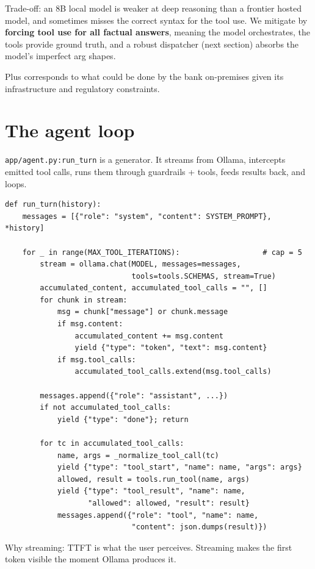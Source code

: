 \documentclass[11pt]{article}
\begin{document}
Trade-off: an 8B local model is weaker at deep reasoning than a frontier hosted model, and sometimes misses the correct syntax for the tool use. We mitigate by \textbf{forcing tool use for all factual answers}, meaning the model orchestrates, the tools provide ground truth, and a robust dispatcher (next section) absorbs the model's imperfect arg shapes.

Plus corresponds to what could be done by the bank on-premises given its infrastructure and regulatory constraints.

\section{The agent loop}

\texttt{app/agent.py:run\_turn} is a generator. It streams from Ollama, intercepts emitted tool calls, runs them through guardrails + tools, feeds results back, and loops.

\begin{lstlisting}[style=py]
def run_turn(history):
    messages = [{"role": "system", "content": SYSTEM_PROMPT}, *history]

    for _ in range(MAX_TOOL_ITERATIONS):                   # cap = 5
        stream = ollama.chat(MODEL, messages=messages,
                             tools=tools.SCHEMAS, stream=True)
        accumulated_content, accumulated_tool_calls = "", []
        for chunk in stream:
            msg = chunk["message"] or chunk.message
            if msg.content:
                accumulated_content += msg.content
                yield {"type": "token", "text": msg.content}
            if msg.tool_calls:
                accumulated_tool_calls.extend(msg.tool_calls)

        messages.append({"role": "assistant", ...})
        if not accumulated_tool_calls:
            yield {"type": "done"}; return

        for tc in accumulated_tool_calls:
            name, args = _normalize_tool_call(tc)
            yield {"type": "tool_start", "name": name, "args": args}
            allowed, result = tools.run_tool(name, args)
            yield {"type": "tool_result", "name": name,
                   "allowed": allowed, "result": result}
            messages.append({"role": "tool", "name": name,
                             "content": json.dumps(result)})
\end{lstlisting}

Why streaming: TTFT is what the user perceives. Streaming makes the first token visible the moment Ollama produces it.
\end{document}
